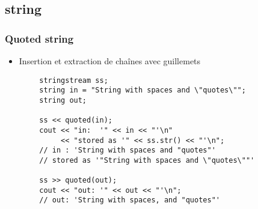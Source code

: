 \documentclass[C++.tex]{subfiles}
\begin{document}
\subsection*{string}
\begin{frame}[fragile]
	\frametitle{Quoted string}
	\begin{itemize}
		\item Insertion et extraction de chaînes avec guillemets
	\end{itemize}

	\begin{verbatim}
		stringstream ss;
		string in = "String with spaces and \"quotes\"";
		string out;

		ss << quoted(in);
		cout << "in:  '" << in << "'\n"
		     << "stored as '" << ss.str() << "'\n";
		// in : 'String with spaces and "quotes"'
		// stored as '"String with spaces and \"quotes\""'

		ss >> quoted(out);
		cout << "out: '" << out << "'\n";
		// out: 'String with spaces, and "quotes"'
	\end{verbatim}


\end{frame}
\end{document}
